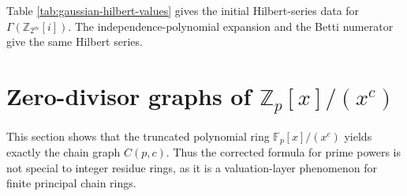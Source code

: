 \documentclass[12pt]{article}
\theoremstyle{definition}
\begin{document}
\medskip

\begin{table}[H]
	\centering
	\caption{Initial Hilbert-series data for $\Gamma(\mathbb{Z}_{2^m}[i])$.}
	\label{tab:gaussian-hilbert-values}
\end{table}

Table \ref{tab:gaussian-hilbert-values} gives the initial Hilbert-series data for $\Gamma(\mathbb{Z}_{2^m}[i])$.  The independence-polynomial expansion and the Betti numerator give the same Hilbert series.
\medskip

\section{Zero-divisor graphs of \texorpdfstring{$\mathbb{Z}_p[x]/(x^c)$}{Z_p[x]/(x^c)}}\label{sec:poly-ring}
 This section shows that the truncated polynomial ring $\mathbb F_p[x]/(x^c)$ yields exactly the chain graph $C(p,c)$.  Thus the corrected formula for prime powers is not special to integer residue rings, as it is a valuation-layer phenomenon for finite principal chain rings.
\end{document}
